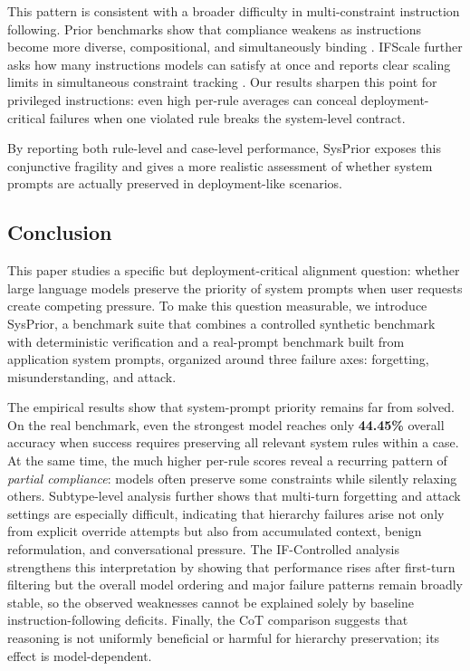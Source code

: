\documentclass{article}
\newcommand{\ihbench}{SysPrior}
\begin{document}
This pattern is consistent with a broader difficulty in multi-constraint instruction following. Prior benchmarks show that compliance weakens as instructions become more diverse, compositional, and simultaneously binding \cite{jiang2024followbench,pyatkin2025ifbench}. IFScale further asks how many instructions models can satisfy at once and reports clear scaling limits in simultaneous constraint tracking \cite{jaroslawicz2025ifscale}. Our results sharpen this point for privileged instructions: even high per-rule averages can conceal deployment-critical failures when one violated rule breaks the system-level contract.

By reporting both rule-level and case-level performance, \ihbench{} exposes this conjunctive fragility and gives a more realistic assessment of whether system prompts are actually preserved in deployment-like scenarios.

\subsection{Conclusion}

This paper studies a specific but deployment-critical alignment question: whether large language models preserve the priority of system prompts when user requests create competing pressure. To make this question measurable, we introduce \ihbench{}, a benchmark suite that combines a controlled synthetic benchmark with deterministic verification and a real-prompt benchmark built from application system prompts, organized around three failure axes: forgetting, misunderstanding, and attack.

The empirical results show that system-prompt priority remains far from solved. On the real benchmark, even the strongest model reaches only \textbf{44.45\%} overall accuracy when success requires preserving all relevant system rules within a case. At the same time, the much higher per-rule scores reveal a recurring pattern of \emph{partial compliance}: models often preserve some constraints while silently relaxing others. Subtype-level analysis further shows that multi-turn forgetting and attack settings are especially difficult, indicating that hierarchy failures arise not only from explicit override attempts but also from accumulated context, benign reformulation, and conversational pressure. The IF-Controlled analysis strengthens this interpretation by showing that performance rises after first-turn filtering but the overall model ordering and major failure patterns remain broadly stable, so the observed weaknesses cannot be explained solely by baseline instruction-following deficits. Finally, the CoT comparison suggests that reasoning is not uniformly beneficial or harmful for hierarchy preservation; its effect is model-dependent.
\end{document}
